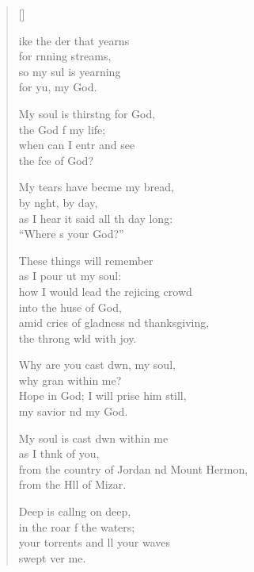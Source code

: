 \settowidth{\versewidth}{from the country of Jordan and Mount Hermon, *}
\begin{verse}[\versewidth]
  \begin{patverse}
ike the der that yearns\Med\\
for rnning streams,\\
so my sul is yearning\Med\\
for yu, my God.

My soul is thirst\pointup{\i}ng for God,\Med\\
the God f my life;\\
when can I entr and see\Med\\
the fce of God?

My tears have becme my bread,\Med\\
by n\pointup{\i}ght, by day,\\
as I hear it said all th day long:\Med\\
“Where \pointup{\i}s your God?”

These things will  remember\Med\\
as I pour ut my soul:\\
how I would lead the rejicing crowd\Med\\
into the huse of God,\\
amid cries of gladness nd thanksgiving,\Med\\
the throng w\pointup{\i}ld with joy.

Why are you cast dwn, my soul,\Med\\
why gran within me?\\
Hope in God; I will prise him still,\Med\\
my savior nd my God.

My soul is cast dwn within me\Med\\
as I th\pointup{\i}nk of you,\\
from the country of Jordan nd Mount Hermon,\Med\\
from the H\pointup{\i}ll of Mizar.

Deep is call\pointup{\i}ng on deep,\Med\\
in the roar f the waters;\\
your torrents and ll your waves\Med\\
swept ver me.


\end{patverse}
\end{verse}
